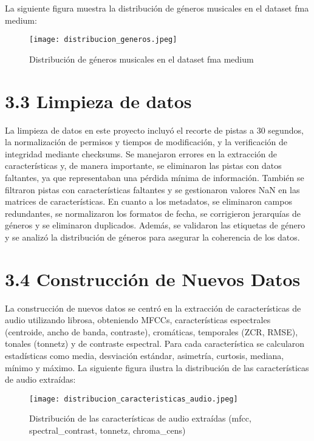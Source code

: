 \documentclass{article}
\begin{document}
La siguiente figura muestra la distribución de géneros musicales en el dataset fma medium:

\begin{figure}[H]
    \centering
    \texttt{[image: distribucion\_generos.jpeg]}
    \caption{Distribución de géneros musicales en el dataset fma medium}
    \label{fig:distribucion_generos}
\end{figure}

\section*{3.3 Limpieza de datos}
La limpieza de datos en este proyecto incluyó el recorte de pistas a 30 segundos, la normalización de permisos y tiempos de modificación, y la verificación de integridad mediante checksums. Se manejaron errores en la extracción de características y, de manera importante, se eliminaron las pistas con datos faltantes, ya que representaban una pérdida mínima de información. También se filtraron pistas con características faltantes y se gestionaron valores NaN en las matrices de características. En cuanto a los metadatos, se eliminaron campos redundantes, se normalizaron los formatos de fecha, se corrigieron jerarquías de géneros y se eliminaron duplicados. Además, se validaron las etiquetas de género y se analizó la distribución de géneros para asegurar la coherencia de los datos.

\section*{3.4 Construcción de Nuevos Datos}
La construcción de nuevos datos se centró en la extracción de características de audio utilizando librosa, obteniendo MFCCs, características espectrales (centroide, ancho de banda, contraste), cromáticas, temporales (ZCR, RMSE), tonales (tonnetz) y de contraste espectral. Para cada característica se calcularon estadísticas como media, desviación estándar, asimetría, curtosis, mediana, mínimo y máximo. La siguiente figura ilustra la distribución de las características de audio extraídas:

\begin{figure}[H]
    \centering
    \texttt{[image: distribucion\_caracteristicas\_audio.jpeg]}
    \caption{Distribución de las características de audio extraídas (mfcc, spectral\_contrast, tonnetz, chroma\_cens)}
    \label{fig:distribucion_caracteristicas_audio}
\end{figure}
\end{document}
